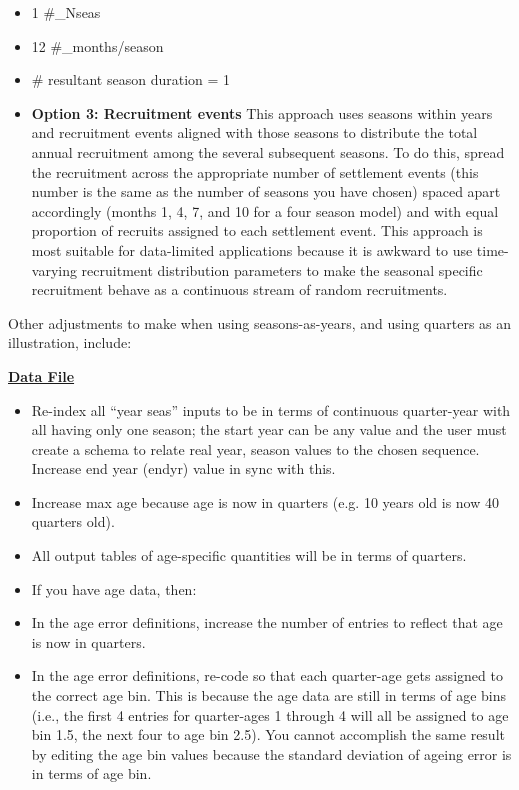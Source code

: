 \begin{itemize}
		\item 1 \#\_Nseas
		\item 12 \#\_months/season
		\item \# resultant season duration = 1
	\item \textbf{Option 3: Recruitment events}
	This approach uses seasons within years and recruitment events aligned with those seasons to distribute the total annual recruitment among the several subsequent seasons. To do this, spread the recruitment across the appropriate number of settlement events (this number is the same as the number of seasons you have chosen) spaced apart accordingly (months 1, 4, 7, and 10 for a four season model) and with equal proportion of recruits assigned to each settlement event. This approach is most suitable for data-limited applications because it is awkward to use time-varying recruitment distribution parameters to make the seasonal specific recruitment behave as a continuous stream of random recruitments.
\end{itemize}

Other adjustments to make when using seasons-as-years, and using quarters as an illustration, include:

\textbf{\underline{Data File}}
\begin{itemize}
	\item Re-index all “year seas” inputs to be in terms of continuous quarter-year with all having only one season; the start year can be any value and the user must create a schema to relate real year, season values to the chosen sequence. Increase end year (endyr) value in sync with this.
	\item Increase max age because age is now in quarters (e.g. 10 years old is now 40 quarters old).
	\item All output tables of age-specific quantities will be in terms of quarters.
	\item If you have age data, then:
		\item In the age error definitions, increase the number of entries to reflect that age is now in quarters.
		\item In the age error definitions, re-code so that each quarter-age gets assigned to the correct age bin. This is because the age data are still in terms of age bins (i.e., the first 4 entries for quarter-ages 1 through 4 will all be assigned to age bin 1.5, the next four to age bin 2.5). You cannot accomplish the same result by editing the age bin values because the standard deviation of ageing error is in terms of age bin.
\end{itemize}

